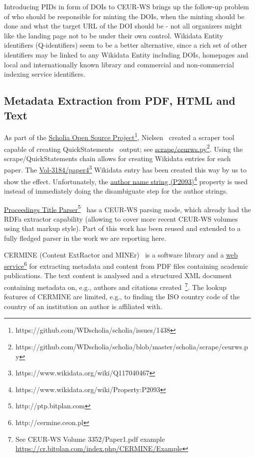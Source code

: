 \documentclass[]{ceurart}
\newcommand{\footnotelink}[2]{\href{#1}{#2}\footnote{#1}}
\newcommand{\wdp}[2]{\footnotelink{https://www.wikidata.org/wiki/Property:#2}{#1 (#2)}}
\begin{document}
Introducing PIDs in form of DOIs to CEUR-WS brings up the follow-up problem of who should be responsible for minting the DOIs, when the minting should be done and what the target URL of the DOI should be - not all organizers might like the landing page not to be under their own control. Wikidata Entity identifiers (Q-identifiers) seem to be a better alternative, since a rich set of other identifiers may be linked to any Wikidata Entity including DOIs, homepages and local and internationally known library and commercial and non-commercial indexing service identifiers.

\subsection{Metadata Extraction from PDF, HTML and Text} 

As part of the \footnotelink{https://github.com/WDscholia/scholia/issues/1438}{Scholia Open Source Project}, Nielsen~\cite{Nielsen2017} created a scraper tool capable of creating QuickStatements~\cite{Manske2016} output; see \footnotelink{https://github.com/WDscholia/scholia/blob/master/scholia/scrape/ceurws.py}{scrape/ceurws.py}. Using the scrape/QuickStatements chain allows for creating Wikidata entries for each paper. The \footnotelink{https://www.wikidata.org/wiki/Q117040467}{Vol-3184/paper4} Wikidata entry has been created this way by us to show the effect. Unfortunately, the \wdp{author name string}{P2093} property is used instead of immediately doing the disambiguate step for the author strings. 

\footnotelink{http://ptp.bitplan.com}{Proceedings Title Parser}~\cite{Fahl2022} 
has a CEUR-WS parsing mode, which already had the RDFa extractor capability (allowing to cover more recent CEUR-WS volumes using that markup style). Part of this work has been reused and extended to a fully fledged parser in the work we are reporting here.

CERMINE (Content ExtRactor and MINEr)~\cite{Tkaczyk_2015} is a software library and a  \footnotelink{http://cermine.ceon.pl}{web service} for extracting metadata and content from PDF files containing academic publications.
The text content is analysed and a structured XML document containing metadata on, e.g., authors and citations created~\footnote{See CEUR-WS Volume 3352/Paper1.pdf example \url{https://cr.bitplan.com/index.php/CERMINE/Example}}.
The lookup features of CERMINE are limited, e.g., to finding the ISO country code of the country of an institution an author is affiliated with.
\end{document}

